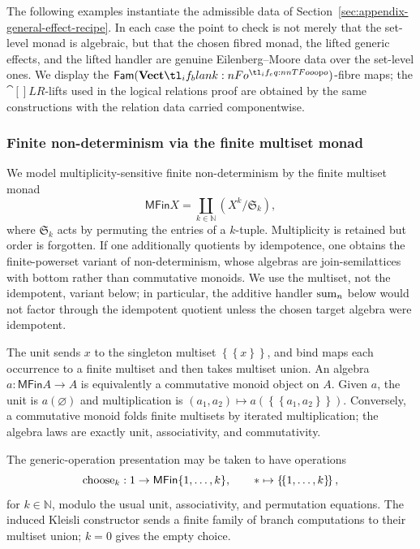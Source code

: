 \documentclass[11pt,a4paper]{article}
\theoremstyle{definition}
\theoremstyle{remark}
\providecommand{\N}{\mathbb{N}}
\providecommand{\Fam}[1]{\mathsf{Fam}(#1)}
\providecommand{\MFin}{\mathsf{MFin}}
\begin{document}
The following examples instantiate the admissible data of
Section~\ref{sec:appendix-general-effect-recipe}.  In each case the point to
check is not merely that the set-level monad is algebraic, but that the chosen
fibred monad, the lifted generic effects, and the lifted handler are genuine
Eilenberg--Moore data over the set-level ones.  We display the
\(\Fam{\Vect[o]}\)-fibre maps; the \(\cat[]{LR}\)-lifts used in the logical
relations proof are obtained by the same constructions with the relation data
carried componentwise.

\subsubsection{Finite non-determinism via the finite multiset monad}
\label{sec:appendix-multiset-nondeterminism}

We model multiplicity-sensitive finite non-determinism by the finite multiset monad
\[
  \MFin X = \coprod_{k \in \N} \left(X^{k}/\mathfrak{S}_{k}\right),
\]
where \( \mathfrak{S}_{k} \) acts by permuting the entries of a \( k \)-tuple.
Multiplicity is retained but order is forgotten.  If one additionally quotients
by idempotence, one obtains the finite-powerset variant of non-determinism,
whose algebras are join-semilattices with bottom rather than commutative
monoids.  We use the multiset, not the idempotent, variant below; in particular,
the additive handler \(\opn{sum}_n\) below would not factor through the
idempotent quotient unless the chosen target algebra were idempotent.

The unit sends \(x\) to the singleton multiset
\(\left\{\!\left\{x\right\}\!\right\}\), and bind maps each occurrence to a
finite multiset and then takes multiset union.  An algebra
\(a:\MFin A\to A\) is equivalently a commutative monoid object on \(A\).  Given
\(a\), the unit is \(a(\varnothing)\) and multiplication is
\((a_1,a_2)\mapsto a(\left\{\!\left\{a_1,a_2\right\}\!\right\})\).  Conversely,
a commutative monoid folds finite multisets by iterated multiplication; the
algebra laws are exactly unit, associativity, and commutativity.

The generic-operation presentation may be taken to have operations
\[
  \opn{choose}_k:1\to \MFin\{1,\dots,k\},
  \qquad
  \ast\mapsto \left\{\!\left\{1,\dots,k\right\}\!\right\},
\]
for \(k\in\N\), modulo the usual unit, associativity, and permutation equations.
The induced Kleisli constructor sends a finite family of branch computations to
their multiset union; \(k=0\) gives the empty choice.
\end{document}

